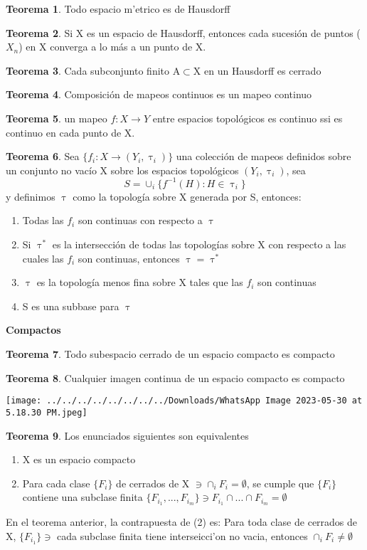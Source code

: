 \documentclass{article}
\theoremstyle{definition}
\newtheorem{theorem}{Teorema}
\begin{document}
\begin{theorem}
	Todo espacio m'etrico es de Hausdorff 
\end{theorem}
\begin{theorem}
	Si X es un espacio de Hausdorff, entonces cada sucesión de puntos ($X_n$) en X converga a lo más a un punto de X.
\end{theorem}
\begin{theorem}
	Cada subconjunto finito A$\subset$X en un Hausdorff es cerrado
\end{theorem}
\begin{theorem}
	Composición de mapeos continuos es un mapeo continuo
\end{theorem}
\begin{theorem}
	 un mapeo $f:X\to Y$ entre espacios topológicos es continuo ssi es continuo en cada punto de X.
\end{theorem}
\begin{theorem}
	Sea $\{f_i:X\to(Y_i,\uptau_i)\}$ una colección de mapeos definidos sobre un conjunto no vacío X sobre los espacios topológicos $(Y_i,\uptau_i)$, sea 
	\[S=\cup_i \{f^{-1}(H):H\in\uptau_i\}\]
	y definimos $\uptau$ como la topología sobre X generada por S, entonces:
	\begin{enumerate}
	\item Todas las $f_i$ son continuas con respecto a $\uptau$
	\item Si $\uptau^*$ es la intersección de todas las topologías sobre X con respecto a las cuales las $f_i$ son continuas, entonces $\uptau=\uptau^*$
	\item $\uptau$ es la topología menos fina sobre X tales que las $f_i$ son continuas
	\item S es una subbase para $\uptau$
	\end{enumerate}
\end{theorem}
\textbf{Compactos}
\begin{theorem}
	Todo subespacio cerrado de un espacio compacto es compacto
\end{theorem}
\begin{theorem}
	Cualquier imagen continua de un espacio compacto es compacto
\end{theorem}
\texttt{[image: ../../../../../../../../Downloads/WhatsApp Image 2023-05-30 at 5.18.30 PM.jpeg]} 
\begin{theorem}
	Los enunciados siguientes son equivalentes
	\begin{enumerate}
	\item X es un espacio compacto
	\item Para cada clase $\{F_i\}$ de cerrados de X $\ni\cap_iF_i=\emptyset$, se cumple que $\{F_i\}$ contiene una subclase finita $\{F_{i_1},...,F_{i_m}\}\ni F_{i_1}\cap ...\cap F_{i_m}=\emptyset$
\end{enumerate}
En el teorema anterior, la contrapuesta de (2) es: Para toda clase de cerrados de X, $\{F_{i_1}\}\ni$ cada subclase finita tiene interseicci'on no vacia, entonces $\cap_iF_i\neq\emptyset$ 
\end{theorem}
\end{document}
